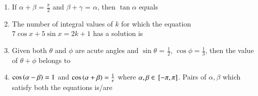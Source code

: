 \begin{enumerate}[label=\thesubsection.\arabic*,ref=\thesubsection.\theenumi]
\item If $\alpha + \beta$ = $\frac{\pi}{2}$ and $\beta + \gamma$ = $\alpha$, then $\tan \alpha$ equals
\hfill{}
\begin{enumerate}
\end{enumerate}
\item The number of integral values of $k$ for which the equation $7\cos x + 5\sin x = 2k+1$ has a solution is
\hfill{}
\begin{enumerate}
\end{enumerate}
\item Given both $\theta$ and $\phi$ are acute angles and $\sin\theta$ = $\frac{1}{2}$, $\cos\phi = \frac{1}{3}$, then the value of $\theta + \phi$ belongs to
\hfill{}
\begin{enumerate}
\begin{multicols}{2}
\item $(\frac{\pi}{3},\frac{\pi}{2}]$
\columnbreak
\item $\brak{\frac{\pi}{2},\frac{2\pi}{3}}$
\end{multicols}
\begin{multicols}{2}
\item $(\frac{2\pi}{3},\frac{5\pi}{6}]$
\columnbreak
\item $(\frac{5\pi}{6},\pi]$
\end{multicols}
\end{enumerate}
\item $\cos\left(\alpha - \beta\right)=1$ and $\cos\left(\alpha + \beta\right)=\frac{1}{e}$ where $\alpha, \beta \in {}\left[-\pi,\pi\right]$. Pairs of $\alpha, \beta$ which satisfy both the equations is/are

\end{enumerate}
